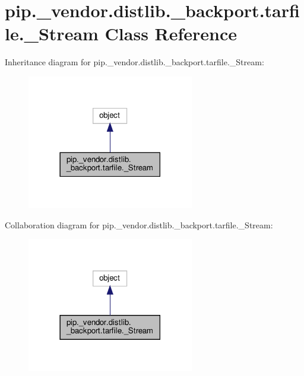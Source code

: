 \hypertarget{classpip_1_1__vendor_1_1distlib_1_1__backport_1_1tarfile_1_1__Stream}{}\section{pip.\+\_\+vendor.\+distlib.\+\_\+backport.\+tarfile.\+\_\+\+Stream Class Reference}
\label{classpip_1_1__vendor_1_1distlib_1_1__backport_1_1tarfile_1_1__Stream}


Inheritance diagram for pip.\+\_\+vendor.\+distlib.\+\_\+backport.\+tarfile.\+\_\+\+Stream\+:
\nopagebreak
\begin{figure}[H]
\begin{center}
\leavevmode
\includegraphics[width=206pt]{classpip_1_1__vendor_1_1distlib_1_1__backport_1_1tarfile_1_1__Stream__inherit__graph}
\end{center}
\end{figure}


Collaboration diagram for pip.\+\_\+vendor.\+distlib.\+\_\+backport.\+tarfile.\+\_\+\+Stream\+:
\nopagebreak
\begin{figure}[H]
\begin{center}
\leavevmode
\includegraphics[width=206pt]{classpip_1_1__vendor_1_1distlib_1_1__backport_1_1tarfile_1_1__Stream__coll__graph}
\end{center}
\end{figure}
